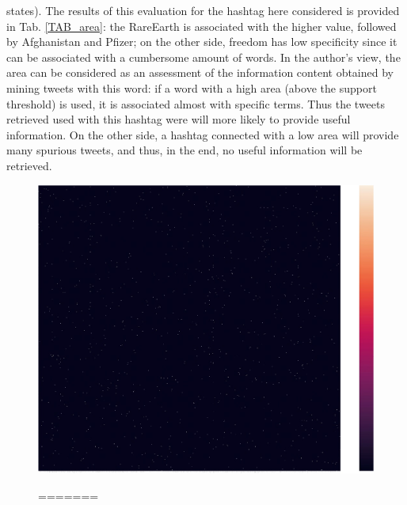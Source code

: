 \documentclass[12pt,%
               a4paper,%
               oneside,openany,%
               titlepage,%
               headinclude,footinclude,%
               BCOR5mm,%
               cleardoublepage=empty,%
               tablecaptionabove,%
               floatperchapter,
               ]{scrreprt}                 %
\begin{document}
states). The results of this evaluation for the hashtag here considered is provided in Tab. \ref{TAB_area}: the RareEarth is associated with the higher value, followed by Afghanistan and Pfizer; on the other side, freedom has low specificity since it can be associated with a cumbersome amount of words. In the author's view, the area can be considered as an assessment of the information content obtained by mining tweets with this word: if a word with a high area (above the support threshold) is used, it is associated almost with specific terms. Thus the tweets retrieved used with this hashtag were will more likely to provide useful information. On the other side, a hashtag connected with a low area will provide many spurious tweets, and thus, in the end, no useful information will be retrieved.


\begin{figure}[ht] 
\begin{minipage}[b]{0.5\linewidth}
    \centering
    \includegraphics[width=.9\linewidth]{Figures/Matrix_rareearth.jpg} 
    \vspace{4ex}
  \end{minipage} 
\begin{minipage}[b]{0.5\linewidth}
=======

\end{minipage}
\end{figure}
\end{document}

